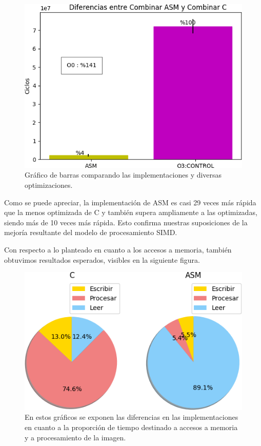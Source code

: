\begin{figure}[h!]
\centering
\captionsetup{justification=centering}
	\includegraphics[width = 12 cm, height = 8 cm]{imagenes/CombinarASMvsC.png}
	\caption[center]{Gráfico de barras comparando las implementaciones y diversas optimizaciones.}
\end{figure}

\par{Como se puede apreciar, la implementación de ASM es casi 29 veces más rápida que la menos optimizada de C y también supera ampliamente a las optimizadas, siendo más de 10 veces más rápida. Esto confirma nuestras suposiciones de la mejoría resultante del modelo de procesamiento SIMD.}

\medskip

\par{Con respecto a lo planteado en cuanto a los accesos a memoria, también obtuvimos resultados esperados, visibles en la siguiente figura.}

\begin{figure}[h!]
\centering
\captionsetup{justification=centering}
	\includegraphics[width = 10 cm, height = 6 cm]{imagenes/CombinarMemoria.png}
\caption[center]{En estos gráficos se exponen las diferencias en las implementaciones en cuanto a la proporción de tiempo destinado a accesos a memoria y a procesamiento de la imagen.}
\end{figure}


